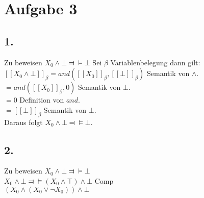 \section*{Aufgabe 3}

\subsection*{1.}
Zu beweisen $X_0 \wedge \bot \Dashv \vDash \bot$
Sei $\beta$ Variablenbelegung dann gilt: \\
$[[X_0 \wedge \bot]]_\beta = and([[X_0]]_\beta, [[\bot]]_\beta)$ Semantik von $\wedge$.\\
$= and([[X_0]]_\beta, 0)$ Semantik von $\bot$.\\
$= 0$ Definition von $and$.\\
$= [[\bot]]_\beta$ Semantik von $\bot$.\\
Daraus folgt $X_0 \wedge \bot \Dashv \vDash \bot$.

\subsection*{2.}
Zu beweisen $X_0 \wedge \bot \Dashv \vDash \bot$\\
$X_0 \wedge \bot \Dashv \vDash (X_0 \wedge \top)  \wedge   \bot$ Comp\\
$ (X_0 \wedge (X_0 \vee \neg X_0))  \wedge   \bot$
